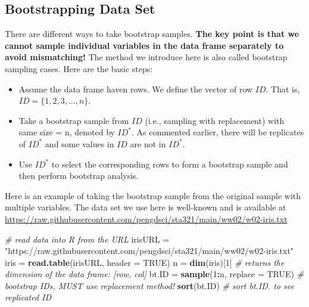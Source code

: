 \documentclass[
]{book}
\newenvironment{Shaded}{\begin{snugshade}}{\end{snugshade}}
\newcommand{\AttributeTok}[1]{\textcolor[rgb]{0.13,0.29,0.53}{#1}}
\newcommand{\CommentTok}[1]{\textcolor[rgb]{0.56,0.35,0.01}{\textit{#1}}}
\newcommand{\ConstantTok}[1]{\textcolor[rgb]{0.56,0.35,0.01}{#1}}
\newcommand{\DecValTok}[1]{\textcolor[rgb]{0.00,0.00,0.81}{#1}}
\newcommand{\FunctionTok}[1]{\textcolor[rgb]{0.13,0.29,0.53}{\textbf{#1}}}
\newcommand{\NormalTok}[1]{#1}
\newcommand{\OtherTok}[1]{\textcolor[rgb]{0.56,0.35,0.01}{#1}}
\newcommand{\SpecialCharTok}[1]{\textcolor[rgb]{0.81,0.36,0.00}{\textbf{#1}}}
\newcommand{\StringTok}[1]{\textcolor[rgb]{0.31,0.60,0.02}{#1}}
\begin{document}
\hypertarget{bootstrapping-data-set}{%
\subsection{Bootstrapping Data Set}\label{bootstrapping-data-set}}

There are different ways to take bootstrap samples. \textbf{The key point is that we cannot sample individual variables in the data frame separately to avoid mismatching!} The method we introduce here is also called bootstrap sampling cases. Here are the basic steps:

\begin{itemize}
\item
  Assume the data frame haven rows. We define the vector of row \(ID\). That is, \(ID = \{1, 2, 3, ..., n\}\).
\item
  Take a bootstrap sample from \(ID\) (i.e., sampling with replacement) with same size = n, denoted by \(ID^*\). As commented earlier, there will be replicates of \(ID^*\) and some values in \(ID\) are not in \(ID^*\).
\item
  Use \(ID^*\) to select the corresponding rows to form a bootstrap sample and then perform bootstrap analysis.
\end{itemize}

Here is an example of taking the bootstrap sample from the original sample with multiple variables. The data set we use here is well-known and is available at \url{https://raw.githubusercontent.com/pengdsci/sta321/main/ww02/w02-iris.txt}

\begin{Shaded}
\begin{Highlighting}[]
\CommentTok{\# read data into R from the URL}
\NormalTok{irisURL }\OtherTok{=} \StringTok{"https://raw.githubusercontent.com/pengdsci/sta321/main/ww02/w02{-}iris.txt"}
\NormalTok{iris }\OtherTok{=} \FunctionTok{read.table}\NormalTok{(irisURL, }\AttributeTok{header =} \ConstantTok{TRUE}\NormalTok{)}
\NormalTok{n }\OtherTok{=} \FunctionTok{dim}\NormalTok{(iris)[}\DecValTok{1}\NormalTok{]   }\CommentTok{\# returns the dimension of the data frame: [row, col]           }
\NormalTok{bt.ID }\OtherTok{=} \FunctionTok{sample}\NormalTok{(}\DecValTok{1}\SpecialCharTok{:}\NormalTok{n, }\AttributeTok{replace =} \ConstantTok{TRUE}\NormalTok{)   }\CommentTok{\# bootstrap IDs, MUST use replacement method!}
\FunctionTok{sort}\NormalTok{(bt.ID)      }\CommentTok{\# sort bt.ID. to see replicated ID}
\end{Highlighting}
\end{Shaded}
\end{document}
